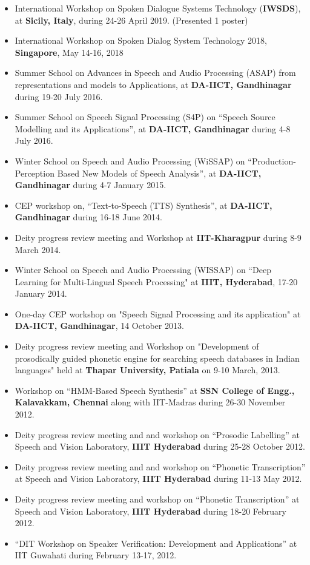 \documentclass[10pt]{article}
\begin{document}
\begin{itemize}
			\setlength\itemsep{0.25em}
\item International Workshop on Spoken Dialogue Systems Technology (\textbf{IWSDS}),  at \textbf{Sicily, Italy}, during 24-26 April 2019. (Presented 1 poster)
\item International Workshop on Spoken Dialog System Technology 2018, \textbf{Singapore}, May 14-16, 2018
\item Summer School on Advances in Speech and Audio Processing (ASAP) from representations and models to Applications, at \textbf{DA-IICT, Gandhinagar} during 19-20 July 2016.
\item Summer School on Speech Signal Processing (S4P) on ``Speech Source Modelling and its Applications'', at \textbf{DA-IICT, Gandhinagar} during 4-8 July 2016.
\item Winter School on Speech and Audio Processing (WiSSAP) on ``Production-Perception Based New Models of Speech Analysis'', at \textbf{DA-IICT, Gandhinagar} during 4-7 January 2015.
\item CEP workshop on, ``Text-to-Speech (TTS) Synthesis'', at \textbf{DA-IICT, Gandhinagar} during 16-18 June 2014.
\item Deity progress review meeting and Workshop at \textbf{IIT-Kharagpur} during 8-9 March 2014.
\item Winter School on Speech and Audio Processing (WISSAP) on ``Deep Learning for Multi-Lingual Speech Processing" at \textbf{IIIT, Hyderabad}, 17-20 January 2014.
\item One-day CEP workshop on "Speech Signal Processing and its application" at \textbf{DA-IICT, Gandhinagar}, 14  October 2013.
\item Deity progress review meeting and Workshop on "Development of prosodically guided phonetic engine for 
searching speech databases in Indian languages" held at \textbf{Thapar University, Patiala} on 9-10 March, 2013.
\item Workshop on ``HMM-Based Speech Synthesis'' at \textbf{SSN College of Engg., Kalavakkam, Chennai} along with IIT-Madras during 26-30 November 2012. 

\item Deity progress review meeting and and workshop on ``Prosodic Labelling''  at Speech and Vision Laboratory, \textbf{IIIT Hyderabad} during 
25-28 October 2012.
\item Deity progress review meeting and and workshop on ``Phonetic Transcription''  at Speech and Vision Laboratory, \textbf{IIIT Hyderabad} during 
11-13 May 2012.
\item Deity progress review meeting and workshop on ``Phonetic Transcription'' at Speech and Vision Laboratory, \textbf{IIIT Hyderabad} during  18-20 February 2012.
\item ``DIT Workshop on Speaker Verification: Development and Applications'' at IIT Guwahati during February 13-17, 2012.
\end{itemize}
\end{document}
